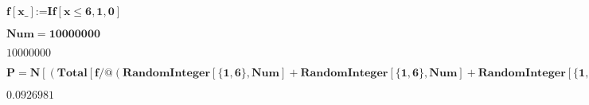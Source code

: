 \documentclass{article}
\begin{document}
\begin{doublespace}
\noindent\(\pmb{f[\text{x$\_$}]\text{:=} \text{If}[x\leq 6,1,0]}\)
\end{doublespace}

\begin{doublespace}
\noindent\(\pmb{\text{Num} = 10000000}\)
\end{doublespace}

\begin{doublespace}
\noindent\(10000000\)
\end{doublespace}

\begin{doublespace}
\noindent\(\pmb{P =N[(\text{Total}[f\text{/@}(\text{RandomInteger}[\{1,6\},\text{Num}] + \text{RandomInteger}[\{1,6\},\text{Num}] + \text{RandomInteger}[\{1,6\},\text{Num}])]/\text{Num})]}\)
\end{doublespace}

\begin{doublespace}
\noindent\(0.0926981\)
\end{doublespace}
\end{document}
